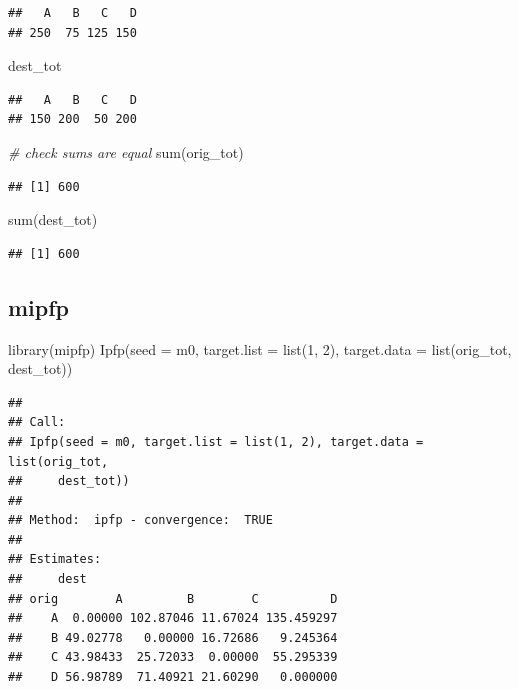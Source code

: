\documentclass[
]{book}
\newenvironment{Shaded}{\begin{snugshade}}{\end{snugshade}}
\newcommand{\AttributeTok}[1]{\textcolor[rgb]{0.77,0.63,0.00}{#1}}
\newcommand{\CommentTok}[1]{\textcolor[rgb]{0.56,0.35,0.01}{\textit{#1}}}
\newcommand{\DecValTok}[1]{\textcolor[rgb]{0.00,0.00,0.81}{#1}}
\newcommand{\FunctionTok}[1]{\textcolor[rgb]{0.00,0.00,0.00}{#1}}
\newcommand{\NormalTok}[1]{#1}
\begin{document}
\begin{verbatim}
##   A   B   C   D 
## 250  75 125 150
\end{verbatim}

\begin{Shaded}
\begin{Highlighting}[]
\NormalTok{dest\_tot}
\end{Highlighting}
\end{Shaded}

\begin{verbatim}
##   A   B   C   D 
## 150 200  50 200
\end{verbatim}

\begin{Shaded}
\begin{Highlighting}[]
\CommentTok{\# check sums are equal}
\FunctionTok{sum}\NormalTok{(orig\_tot)}
\end{Highlighting}
\end{Shaded}

\begin{verbatim}
## [1] 600
\end{verbatim}

\begin{Shaded}
\begin{Highlighting}[]
\FunctionTok{sum}\NormalTok{(dest\_tot)}
\end{Highlighting}
\end{Shaded}

\begin{verbatim}
## [1] 600
\end{verbatim}

\hypertarget{mipfp-3}{%
\subsection{mipfp}\label{mipfp-3}}

\begin{Shaded}
\begin{Highlighting}[]
\FunctionTok{library}\NormalTok{(mipfp)}
\FunctionTok{Ipfp}\NormalTok{(}\AttributeTok{seed =}\NormalTok{ m0, }\AttributeTok{target.list =} \FunctionTok{list}\NormalTok{(}\DecValTok{1}\NormalTok{, }\DecValTok{2}\NormalTok{), }
     \AttributeTok{target.data =} \FunctionTok{list}\NormalTok{(orig\_tot, dest\_tot))}
\end{Highlighting}
\end{Shaded}

\begin{verbatim}
## 
## Call:
## Ipfp(seed = m0, target.list = list(1, 2), target.data = list(orig_tot, 
##     dest_tot))
## 
## Method:  ipfp - convergence:  TRUE 
## 
## Estimates:
##     dest
## orig        A         B        C          D
##    A  0.00000 102.87046 11.67024 135.459297
##    B 49.02778   0.00000 16.72686   9.245364
##    C 43.98433  25.72033  0.00000  55.295339
##    D 56.98789  71.40921 21.60290   0.000000
\end{verbatim}
\end{document}
